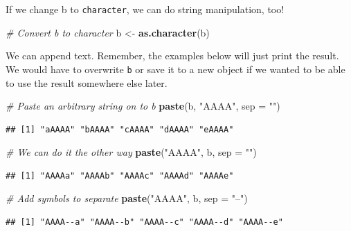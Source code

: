 \documentclass[
]{book}
\newenvironment{Shaded}{\begin{snugshade}}{\end{snugshade}}
\newcommand{\CommentTok}[1]{\textcolor[rgb]{0.56,0.35,0.01}{\textit{#1}}}
\newcommand{\DataTypeTok}[1]{\textcolor[rgb]{0.13,0.29,0.53}{#1}}
\newcommand{\KeywordTok}[1]{\textcolor[rgb]{0.13,0.29,0.53}{\textbf{#1}}}
\newcommand{\NormalTok}[1]{#1}
\newcommand{\StringTok}[1]{\textcolor[rgb]{0.31,0.60,0.02}{#1}}
\begin{document}
If we change b to \texttt{character}, we can do string manipulation, too!

\begin{Shaded}
\begin{Highlighting}[]
\CommentTok{# Convert b to character}
\NormalTok{b <-}\StringTok{ }\KeywordTok{as.character}\NormalTok{(b)}
\end{Highlighting}
\end{Shaded}

We can append text. Remember, the examples below will just print the result. We would have to overwrite \texttt{b} or save it to a new object if we wanted to be able to use the result somewhere else later.

\begin{Shaded}
\begin{Highlighting}[]
\CommentTok{# Paste an arbitrary string on to b}
\KeywordTok{paste}\NormalTok{(b, }\StringTok{"AAAA"}\NormalTok{, }\DataTypeTok{sep =} \StringTok{""}\NormalTok{)}
\end{Highlighting}
\end{Shaded}

\begin{verbatim}
## [1] "aAAAA" "bAAAA" "cAAAA" "dAAAA" "eAAAA"
\end{verbatim}

\begin{Shaded}
\begin{Highlighting}[]
\CommentTok{# We can do it the other way}
\KeywordTok{paste}\NormalTok{(}\StringTok{"AAAA"}\NormalTok{, b, }\DataTypeTok{sep =} \StringTok{""}\NormalTok{)}
\end{Highlighting}
\end{Shaded}

\begin{verbatim}
## [1] "AAAAa" "AAAAb" "AAAAc" "AAAAd" "AAAAe"
\end{verbatim}

\begin{Shaded}
\begin{Highlighting}[]
\CommentTok{# Add symbols to separate}
\KeywordTok{paste}\NormalTok{(}\StringTok{"AAAA"}\NormalTok{, b, }\DataTypeTok{sep =} \StringTok{"--"}\NormalTok{)}
\end{Highlighting}
\end{Shaded}

\begin{verbatim}
## [1] "AAAA--a" "AAAA--b" "AAAA--c" "AAAA--d" "AAAA--e"
\end{verbatim}
\end{document}
